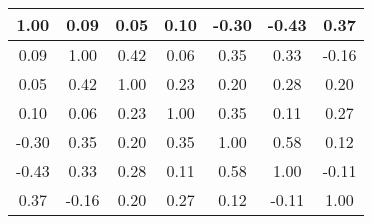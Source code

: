\begin{tabular}{|c|c|c|c|c|c|c|}
\hline
1.00&0.09&0.05&0.10&-0.30&-0.43&0.37\\\hline
0.09&1.00&0.42&0.06&0.35&0.33&-0.16\\\hline
0.05&0.42&1.00&0.23&0.20&0.28&0.20\\\hline
0.10&0.06&0.23&1.00&0.35&0.11&0.27\\\hline
-0.30&0.35&0.20&0.35&1.00&0.58&0.12\\\hline
-0.43&0.33&0.28&0.11&0.58&1.00&-0.11\\\hline
0.37&-0.16&0.20&0.27&0.12&-0.11&1.00\\\hline
\end{tabular}
